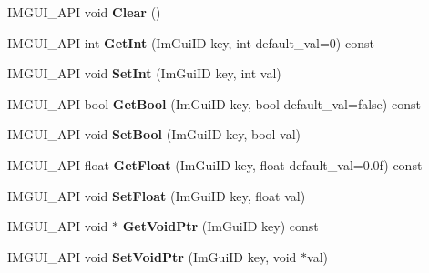 \begin{DoxyCompactItemize}
\item 
\mbox{\label{struct_im_gui_storage_a72ceecfbca3d08df8c2a232b77890c20}} 
I\+M\+G\+U\+I\+\_\+\+A\+PI void {\bfseries Clear} ()
\item 
\mbox{\label{struct_im_gui_storage_ac86b64f5c69a15de6c6c326963eca64a}} 
I\+M\+G\+U\+I\+\_\+\+A\+PI int {\bfseries Get\+Int} (Im\+Gui\+ID key, int default\+\_\+val=0) const
\item 
\mbox{\label{struct_im_gui_storage_af83975ca841a9bd0e06a6ea0a41bf159}} 
I\+M\+G\+U\+I\+\_\+\+A\+PI void {\bfseries Set\+Int} (Im\+Gui\+ID key, int val)
\item 
\mbox{\label{struct_im_gui_storage_a22d34ae6278f86468a3e7df8fbd1b632}} 
I\+M\+G\+U\+I\+\_\+\+A\+PI bool {\bfseries Get\+Bool} (Im\+Gui\+ID key, bool default\+\_\+val=false) const
\item 
\mbox{\label{struct_im_gui_storage_ac5beee31a59b3f5294b41992717be7bf}} 
I\+M\+G\+U\+I\+\_\+\+A\+PI void {\bfseries Set\+Bool} (Im\+Gui\+ID key, bool val)
\item 
\mbox{\label{struct_im_gui_storage_a0f51ef327f7e548d003b0e006967c1eb}} 
I\+M\+G\+U\+I\+\_\+\+A\+PI float {\bfseries Get\+Float} (Im\+Gui\+ID key, float default\+\_\+val=0.\+0f) const
\item 
\mbox{\label{struct_im_gui_storage_ab531d90a0e5a1a2453e351c499149756}} 
I\+M\+G\+U\+I\+\_\+\+A\+PI void {\bfseries Set\+Float} (Im\+Gui\+ID key, float val)
\item 
\mbox{\label{struct_im_gui_storage_aaf87a98ede89da09113b0189f6d878ca}} 
I\+M\+G\+U\+I\+\_\+\+A\+PI void $\ast$ {\bfseries Get\+Void\+Ptr} (Im\+Gui\+ID key) const
\item 
\mbox{\label{struct_im_gui_storage_a55f840086b3ec9cf63c67f02d159204a}} 
I\+M\+G\+U\+I\+\_\+\+A\+PI void {\bfseries Set\+Void\+Ptr} (Im\+Gui\+ID key, void $\ast$val)
\item 

\end{DoxyCompactItemize}
